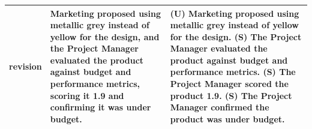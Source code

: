 \begin{table}[htbp]
\begin{tabularx}{\textwidth}{@{}lXX@{}}
revision & Marketing proposed using metallic grey instead of yellow for the design, and the Project Manager evaluated the product against budget and performance metrics, scoring it 1.9 and confirming it was under budget. & (U) Marketing proposed using metallic grey instead of yellow for the design. \newline (S) The Project Manager evaluated the product against budget and performance metrics. \newline (S) The Project Manager scored the product 1.9. \newline (S) The Project Manager confirmed the product was under budget. \\
\bottomrule
\end{tabularx}
\end{table}